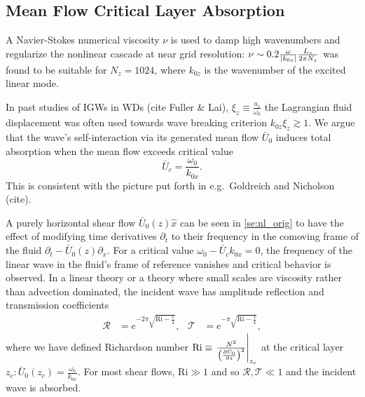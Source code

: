 \documentclass[twocolumn,
        nofootinbib, %
        usenames, %
        aps,
        prd,
        dvipsnames %
    ]{revtex4-1}%
\newcommand*{\pd}[2]{\frac{\partial#1}{\partial#2}}
\newcommand*{\at}[1]{\left.#1\right|}
\DeclarePairedDelimiter\abs{\lvert}{\rvert}
\DeclarePairedDelimiter\p{\lparen}{\rparen}
\begin{document}
\subsection{Mean Flow Critical Layer Absorption}

A
Navier-Stokes numerical viscosity $\nu$ is used to damp high wavenumbers and
regularize the nonlinear cascade at near grid resolution: $\nu \sim 0.2
\frac{\omega}{\abs*{k_{0z}}}\frac{L_z}{2\pi N_z}$ was found to be suitable for
$N_z = 1024$, where $k_{0z}$ is the wavenumber of the excited linear mode.

In past studies of IGWs in WDs (cite Fuller \& Lai), $\xi_z \equiv
\frac{u_z}{\omega_0}$ the Lagrangian fluid displacement was often used towards
wave breaking criterion $k_{0z}\xi_z \gtrsim 1$. We argue that the wave's
self-interaction via its generated mean flow $\bar{U}_0$ induces total
absorption when the mean flow exceeds critical value
\begin{equation}
    \bar{U}_c = \frac{\omega_0}{k_{0x}}.
\end{equation}
This is consistent with the picture put forth in e.g.\ Goldreich and Nicholson
(cite).

A purely horizontal shear flow $\bar{U}_0(z) \hat{x}$ can be seen in
\autoref{se:nl_orig} to have the effect of modifying time derivatives
$\partial_t$ to their frequency in the comoving frame of the fluid $\partial_t -
\bar{U}_0(z)\partial_x$. For a critical value $\omega_0 - \bar{U}_c k_{0x} = 0$,
the frequency of the linear wave in the fluid's frame of reference vanishes and
critical behavior is observed. In a linear theory or a theory where small scales
are viscosity rather than advection dominated, the incident wave has amplitude
reflection and transmission coefficients
\begin{align}
    \mathcal{R} &= e^{-2\pi \sqrt{\mathrm{Ri} - \frac{1}{4}}}, &
    \mathcal{T} &= e^{-\pi \sqrt{\mathrm{Ri} - \frac{1}{4}}},
    \label{eq:crit_coeffs}
\end{align}
where we have defined Richardson number $\mathrm{Ri} \equiv
\at{\frac{N^2}{\p*{\pd{\bar{U}_0}{z}}^2}}_{z_c}$ at the critical layer $z_c:
\bar{U}_0(z_c) = \frac{\omega_0}{k_{0x}}$. For most shear flows, $\mathrm{Ri}
\gg 1$ and so $\mathcal{R}, \mathcal{T} \ll 1$ and the incident wave is
absorbed.
\end{document}
